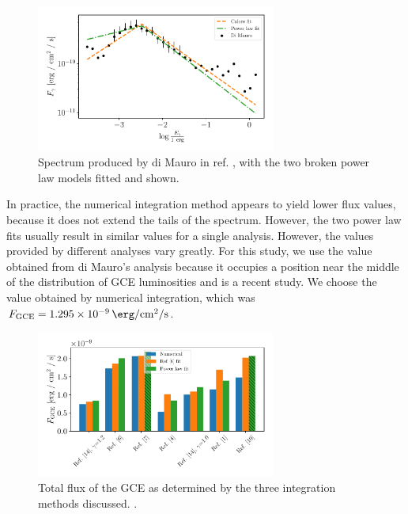\documentclass[a4paper,11pt]{article}
\newcommand{\comment}[1]{\emph{\color{red}{#1}}}
\begin{document}
\begin{figure}
    \centering
    \includegraphics[width=0.7\textwidth]{figs/di-mauro-example.pdf}
    \caption{Spectrum produced by di Mauro in ref. \cite{DiMauro:2021raz}, with the two broken power law models fitted and shown.}
    \label{fig:di-mauro-example}
\end{figure}

In practice, the numerical integration method appears to yield lower flux values, because it does not extend the tails of the spectrum. However, the two power law fits usually result in similar values for a single analysis. However, the values provided by different analyses vary greatly. For this study, we use the value obtained from di Mauro's analysis because it occupies a position near the middle of the distribution of GCE luminosities \comment{(Not anymore!)} and is a recent study. We choose the value obtained by numerical integration, which was $F_\text{GCE} = \SI{1.295e-9}{\erg\per\centi\meter\squared\per\second}$.

\begin{figure}
    \centering
    \includegraphics[width=0.7\textwidth]{figs/total-flux-bars.pdf}
    \caption{Total flux of the GCE as determined by the three integration methods discussed. \comment{Here I would discuss why Ajello doesn't have a value for the power law case if this is still true once I have the original source}.}
    \label{fig:total-flux-bars}
\end{figure}
\end{document}
